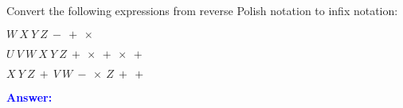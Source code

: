 \item{}
Convert the following expressions from reverse Polish notation to infix
notation:
\begin{list}{\textbf{)}}{}
    \item $W\ X\ Y\ Z\ -\ +\ \times$
    \item $U\ V\ W\ X\ Y\ Z\ +\ \times\ +\ \times\ +$
    \item $X\ Y\ Z\ +\ V\ W\ -\ \times\ Z\ +\ +$
\end{list}
\vskip12pt
\ifanswers
\textcolor{blue}{
\textbf{Answer:}\\
}
\newpage
\fi
